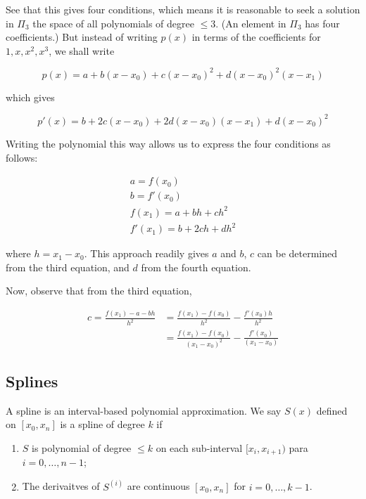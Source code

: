 \documentclass[12pt]{article}
\theoremstyle{definition}
\begin{document}
See that this gives four conditions, which means it is reasonable to seek a
solution in $\Pi_{3}$ the space of all polynomials of degree $\leq 3$. (An
element in $\Pi_3$ has four coefficients.) But instead of writing $p(x)$ in
terms of the coefficients for $1, x, x^2, x^3$, we shall write 

\begin{equation*}
    p(x) = a + b(x - x_0) + c(x - x_0)^2 + d(x-x_0)^2(x - x_1)
\end{equation*}

which gives 

\begin{equation*}
    p'(x) = b + 2c(x-x_0) + 2d(x - x_0)(x-x_1) + d(x-x_0)^2
\end{equation*}

Writing the polynomial  this way allows us to express the four conditions as
follows: 

\begin{align*}
    a = f(x_0) \\ 
    b = f'(x_0)\\ 
    f(x_1) = a + bh + ch^2 \\ 
    f'(x_1) = b + 2ch + dh^2
\end{align*}

where $h = x_1 - x_0$. This approach readily gives $a$ and $b$, $c$ can be
determined from the third equation, and $d$ from the fourth equation.

Now, observe that from the third equation,

\begin{align*}
    c = \frac{ f(x_1) - a - bh }{h^2} 
    &= \frac{f(x_1) - f(x_0)}{h^2} -
    \frac{f'(x_0)h}{h^2}\\ 
    &=\frac{f(x_1) - f(x_0)}{(x_1-x_0)^2} - \frac{f'(x_0)}{(x_1 - x_0)}
\end{align*}

\subsection{Splines}

A spline is an interval-based polynomial approximation. We say $S(x)$ defined on
$[x_0, x_n]$ is a spline of degree $k$ if

\begin{enumerate}
    \item $S$ is polynomial of degree $\leq k$ on each sub-interval $[x_i,
        x_{i+1})$ para $i = 0, \ldots, n-1$; 
    \item The derivaitves of $S^{(i)}$ are continuous $[x_0, x_n]$ for $i = 0,
        \ldots, k-1$.
\end{enumerate}
\end{document}
